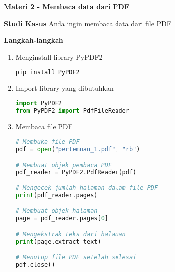 \documentclass{article}
\begin{document}
    \begin{flushleft}
        \textbf{Materi 2 - Membaca data dari PDF}
        \newline

        \textbf{Studi Kasus}
        \newline
        Anda ingin membaca data dari file PDF
        \newline

        \textbf{Langkah-langkah}

        \begin{enumerate}
            \item Menginstall library PyPDF2
            \lstset{style=bashstyle}
            \begin{lstlisting}[language=bash]
pip install PyPDF2
            \end{lstlisting}

            \item Import library yang dibutuhkan
            \lstset{style=pythonstyle}
            \begin{lstlisting}[language=python]
import PyPDF2
from PyPDF2 import PdfFileReader
            \end{lstlisting}

            \item Membaca file PDF
            \lstset{style=pythonstyle}
            \begin{lstlisting}[language=python]
# Membuka file PDF
pdf = open("pertemuan_1.pdf", "rb")

# Membuat objek pembaca PDF
pdf_reader = PyPDF2.PdfReader(pdf)

# Mengecek jumlah halaman dalam file PDF
print(pdf_reader.pages)

# Membuat objek halaman
page = pdf_reader.pages[0]

# Mengekstrak teks dari halaman
print(page.extract_text)

# Menutup file PDF setelah selesai
pdf.close()
            \end{lstlisting}
        \end{enumerate}
    \end{flushleft}
\end{document}
